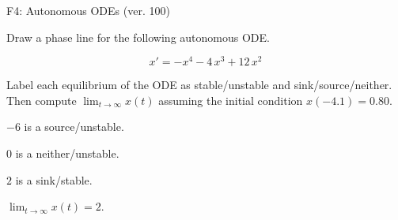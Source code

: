 \begin{exercise}
  \begin{exerciseTitle}F4: Autonomous ODEs (ver. 100)\end{exerciseTitle}
  \begin{exerciseStatement}
    

      Draw a phase line for the following 
      autonomous ODE.
    

    
\[x'= -x^{4} - 4 \, x^{3} + 12 \, x^{2}\]

    

      Label each equilibrium of the ODE
      as stable/unstable and sink/source/neither.
      Then compute \(\lim_{t\to\infty}x(t)\)
      assuming the initial condition
      \(x( -4.1 )= 0.80\).
    

  \end{exerciseStatement}
  \begin{exerciseAnswer}
    

      \(-6\) is a source/unstable.
      
        \(0\) is a neither/unstable.
      
      \(2\) is a sink/stable.
    

    

      \(\lim_{t\to\infty}x(t)=2\).
    

  \end{exerciseAnswer}
\end{exercise}